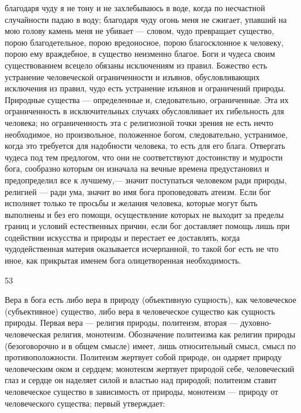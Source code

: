 \documentclass[12pt]{article}
\begin{document}
благодаря чуду я не тону и не захлебываюсь в воде, когда по несчастной случайности падаю в воду; благодаря чуду огонь меня не сжигает, упавший на мою голову камень меня не убивает --- словом, чудо превращает существо, порою благодетельное, порою вредоносное, порою благосклонное к человеку, порою ему враждебное, в существо неизменно благое. Боги и чудеса своим существованием всецело обязаны исключениям из правил. Божество есть устранение человеческой ограниченности и изъянов, обусловливающих исключения из правил, чудо есть устранение изъянов и ограничений природы. Природные существа --- определенные и, следовательно, ограниченные. Эта их ограниченность в исключительных случаях обусловливает их гибельность для человека; но ограниченность эта с религиозной точки зрения не есть нечто необходимое, но произвольное, положенное богом, следовательно, устранимое, когда это требуется для надобности человека, то есть для его блага. Отвергать чудеса под тем предлогом, что они не соответствуют достоинству и мудрости бога, сообразно которым он изначала на вечные времена предустановил и предопределил все к лучшему,--- значит поступаться человеком ради природы, религией --- ради ума, значит во имя бога проповедовать атеизм. Если бог исполняет только те просьбы и желания человека, которые могут быть выполнены и без его помощи, осуществление которых не выходит за пределы границ и условий естественных причин, если бог доставляет помощь лишь при содействии искусства и природы и перестает ее доставлять, когда чудодейственная материя оказывается исчерпанной, то такой бог есть не что иное, как прикрытая именем бога олицетворенная необходимость.



53

Вера в бога есть либо вера в природу (объективную сущность), как человеческое (субъективное) существо, либо вера в человеческое существо как сущность природы. Первая вера --- религия природы, политеизм, вторая --- духовно-человеческая религия, монотеизм. Обозначение политеизма как религии природы (безоговорочно и в общем смысле) имеет, лишь относительный смысл, смысл по противоположности. Политеизм жертвует собой природе, он одаряет природу человеческим оком и сердцем; монотеизм жертвует природой себе, человеческий глаз и сердце он наделяет силой и властью над природой; политеизм ставит человеческое существо в зависимость от природы, монотеизм --- природу от человеческого существа; первый утверждает:
\end{document}

